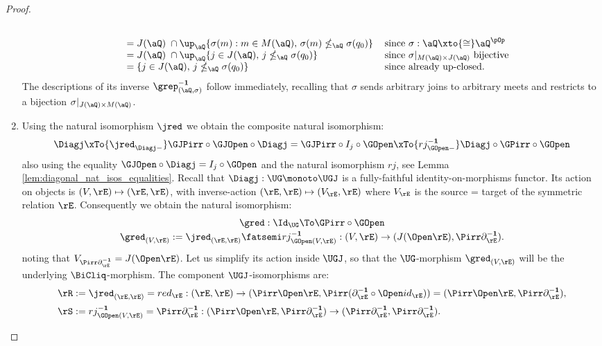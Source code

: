 \documentclass{article}
\begin{document}
\begin{proof}
\begin{enumerate}
\[\begin{tabular}{lll}
\\&
$= J(\aQ) \;\cap \up_\aQ \{ \sigma(m) : m \in M(\aQ), \, \sigma(m) \nleq_\aQ \sigma(q_0) \}$
& since $\sigma : \aQ \xto{\cong} \aQ^{\pOp}$
\\&
$= J(\aQ) \;\cap \up_\aQ \{ j \in J(\aQ), \, j \nleq_\aQ \sigma(q_0) \}$
& since $\sigma |_{M(\aQ) \times J(\aQ)}$ bijective
\\&
$= \{ j \in J(\aQ), \, j \nleq_\aQ \sigma(q_0) \}$
& since already up-closed.
\end{tabular}
\]
The descriptions of its inverse $\grep_{(\aQ,\sigma)}^{\bf-1}$ follow immediately, recalling that $\sigma$ sends arbitrary joins to arbitrary meets and restricts to a bijection $\sigma |_{J(\aQ) \times M(\aQ)}$.

\item 
Using the natural isomorphism $\jred$ we obtain the composite natural isomorphism:
\[
\Diagj \xTo{\jred_{\Diagj -}} \GJPirr \circ \GJOpen \circ \Diagj
= \GJPirr \circ I_j \circ \GOpen
\xTo{rj_{\GOpen - }^{\bf-1}} \Diagj \circ \GPirr \circ \GOpen
\]
also using the equality $\GJOpen \circ \Diagj = I_j \circ \GOpen$ and the natural isomorphism $rj$, see Lemma \ref{lem:diagonal_nat_isos_equalities}. Recall that $\Diagj : \UG \monoto \UGJ$ is a fully-faithful identity-on-morphisms functor. Its action on objects is $(V,\rE) \mapsto (\rE,\rE)$, with inverse-action $(\rE,\rE) \mapsto (V_\rE,\rE)$ where $V_\rE$ is the source = target of the symmetric relation $\rE$. Consequently we obtain the natural isomorphism:
\[
\begin{tabular}{c}
$\gred : \Id_{\UG} \To \GPirr \circ \GOpen$
\\[0.5ex]
$\gred_{(V,\rE)} := \jred_{(\rE,\rE)} \fatsemi rj_{\GOpen(V,\rE)}^{\bf-1} : (V,\rE) \to (J(\Open\rE),\Pirr\partial_\rE^{\bf-1})$.
\end{tabular}
\]
noting that $V_{\Pirr\partial_\rE^{\bf-1}} = J(\Open\rE)$. Let us simplify its action inside $\UGJ$, so that the $\UG$-morphism $\gred_{(V,\rE)}$ will be the underlying $\BiCliq$-morphism. The component $\UGJ$-isomorphisms are:
\[
\begin{tabular}{lll}
$\rR := \jred_{(\rE,\rE)} = red_\rE : (\rE,\rE) \to (\Pirr\Open\rE,\Pirr(\partial_\rE^{\bf-1} \circ \Open id_\rE)) = (\Pirr\Open\rE,\Pirr\partial_\rE^{\bf-1})$,
\\[1.5ex]
$\rS := rj_{\GOpen(V,\rE)}^{\bf-1} = \Pirr\partial_\rE^{\bf-1} : (\Pirr\Open\rE,\Pirr\partial_\rE^{\bf-1}) \to (\Pirr\partial_\rE^{\bf-1},\Pirr\partial_\rE^{\bf-1})$.
\end{tabular}
\]
\end{enumerate}
\end{proof}
\end{document}
